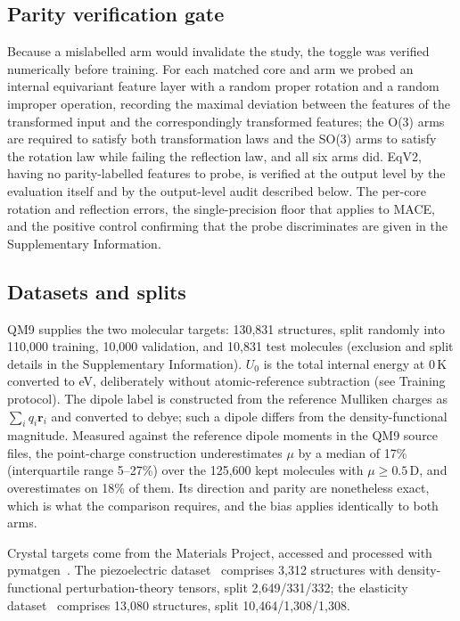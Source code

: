 \subsection*{Parity verification gate}

Because a mislabelled arm would invalidate the study, the toggle was verified numerically before training. For each matched core and arm we probed an internal equivariant feature layer with a random proper rotation and a random improper operation, recording the maximal deviation between the features of the transformed input and the correspondingly transformed features; the O(3) arms are required to satisfy both transformation laws and the SO(3) arms to satisfy the rotation law while failing the reflection law, and all six arms did. EqV2, having no parity-labelled features to probe, is verified at the output level by the evaluation itself and by the output-level audit described below. The per-core rotation and reflection errors, the single-precision floor that applies to MACE, and the positive control confirming that the probe discriminates are given in the Supplementary Information.

\subsection*{Datasets and splits}

QM9 supplies the two molecular targets: 130,831 structures, split randomly into 110,000 training, 10,000 validation, and 10,831 test molecules (exclusion and split details in the Supplementary Information). $U_0$ is the total internal energy at 0\,K converted to eV, deliberately without atomic-reference subtraction (see Training protocol). The dipole label is constructed from the reference Mulliken charges as $\sum_i q_i \mathbf{r}_i$ and converted to debye; such a dipole differs from the density-functional magnitude. Measured against the reference dipole moments in the QM9 source files, the point-charge construction underestimates $\mu$ by a median of 17\% (interquartile range 5--27\%) over the 125,600 kept molecules with $\mu \geq 0.5$\,D, and overestimates on 18\% of them. Its direction and parity are nonetheless exact, which is what the comparison requires, and the bias applies identically to both arms.

Crystal targets come from the Materials Project, accessed and processed with pymatgen~\cite{ong2013pymatgen}. The piezoelectric dataset~\cite{dejong2015piezo} comprises 3,312 structures with density-functional perturbation-theory tensors, split 2,649/331/332; the elasticity dataset~\cite{dejong2015elastic} comprises 13,080 structures, split 10,464/1,308/1,308.


